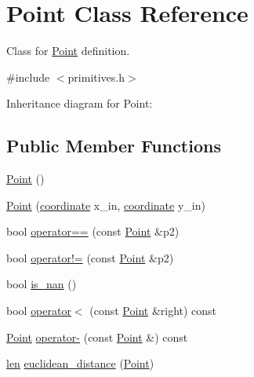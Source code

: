 \hypertarget{class_point}{}\section{Point Class Reference}
\label{class_point}


Class for \mbox{\hyperlink{class_point}{Point}} definition.  




{\ttfamily \#include $<$primitives.\+h$>$}



Inheritance diagram for Point\+:
\subsection*{Public Member Functions}
\begin{DoxyCompactItemize}
\item 
\mbox{\hyperlink{class_point_ad92f2337b839a94ce97dcdb439b4325a}{Point}} ()
\item 
\mbox{\hyperlink{class_point_af7373698b9fafc53b0a5d06e511642e1}{Point}} (\mbox{\hyperlink{primitives_8h_a9949b5198385a93773b854932cb22e08}{coordinate}} x\+\_\+in, \mbox{\hyperlink{primitives_8h_a9949b5198385a93773b854932cb22e08}{coordinate}} y\+\_\+in)
\item 
bool \mbox{\hyperlink{class_point_ac7bc64b9a683d5fb35780c739779f2fc}{operator==}} (const \mbox{\hyperlink{class_point}{Point}} \&p2)
\item 
bool \mbox{\hyperlink{class_point_ade5f3908ec0e412aea8c3e12f5d0e26f}{operator!=}} (const \mbox{\hyperlink{class_point}{Point}} \&p2)
\item 
bool \mbox{\hyperlink{class_point_a2bc8aed929f6be2b543ba2f26b8a5f72}{is\+\_\+nan}} ()
\item 
bool \mbox{\hyperlink{class_point_a2d285a505e84d64a96974d5247e8ae7a}{operator$<$}} (const \mbox{\hyperlink{class_point}{Point}} \&right) const
\item 
\mbox{\hyperlink{class_point}{Point}} \mbox{\hyperlink{class_point_aa3b47f3a3a36f3653f0b1e26dd197257}{operator-\/}} (const \mbox{\hyperlink{class_point}{Point}} \&) const
\item 
\mbox{\hyperlink{primitives_8h_a0daa439ba651ea0fd8d02392244db601}{len}} \mbox{\hyperlink{class_point_aa87b9392648b5001da929ba90f205c4d}{euclidean\+\_\+distance}} (\mbox{\hyperlink{class_point}{Point}})
\end{DoxyCompactItemize}
